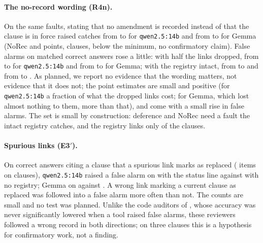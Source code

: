 \paragraph{The no-record wording (R4n).} On the same faults, stating that no amendment is recorded instead of that
the clause is in force raised catches from \CatchDroppedRFourQwenFourteen{} to \CatchDroppedRFournQwenFourteen{}
for \texttt{qwen2.5:14b} and from \CatchDroppedRFourGemma{} to \CatchDroppedRFournGemma{} for Gemma (NoRec
\DiffNoRecQwenFourteen{} and \DiffNoRecGemma{} points, \NNoRecClausesQwenFourteen{} clauses, below the minimum,
no confirmatory claim). False alarms on matched correct answers rose a little: with half the links dropped, from
\FAMQwenFourteenRFourDropFifty{} to \FAMQwenFourteenRFourNDropFifty{} for \texttt{qwen2.5:14b} and from
\FAMGemmaRFourDropFifty{} to \FAMGemmaRFourNDropFifty{} for Gemma; with the registry intact, from
\FAMQwenFourteenRFour{} to \FAMQwenFourteenRFourN{} and from \FAMGemmaRFour{} to \FAMGemmaRFourN. As planned, we
report no evidence that the wording matters, not evidence that it does not; the point estimates are small and
positive (for \texttt{qwen2.5:14b} a fraction of what the dropped links cost; for Gemma, which lost almost nothing to
them, more than that), and come with a small rise in false alarms. The set is
small by construction: deference and NoRec need a fault the intact registry catches, and the registry links only
\NRegistryFlagged{} of the \NClauses{} clauses.

\paragraph{Spurious links (E3$'$).} On correct answers citing a clause that a spurious link marks as replaced
(\KNSpuriousMarkedQwenFourteen{} items on \NSpuriousClausesQwenFourteen{} clauses), \texttt{qwen2.5:14b} raised a false alarm on
\FASpuriousMarkedQwenFourteen{} with the status line against \OwnFASpuriousMarkedQwenFourteen{} with no registry;
Gemma on \FASpuriousMarkedGemma{} against \OwnFASpuriousMarkedGemma{}. A wrong link marking a current clause as
replaced was followed into a false alarm more often than not. The counts are small and no test was planned. Unlike the code auditors of \citet{liu2026trusting}, whose accuracy was never significantly lowered
when a tool raised false alarms, these reviewers followed a wrong record in both directions; on three clauses this is a
hypothesis for confirmatory work, not a finding.

